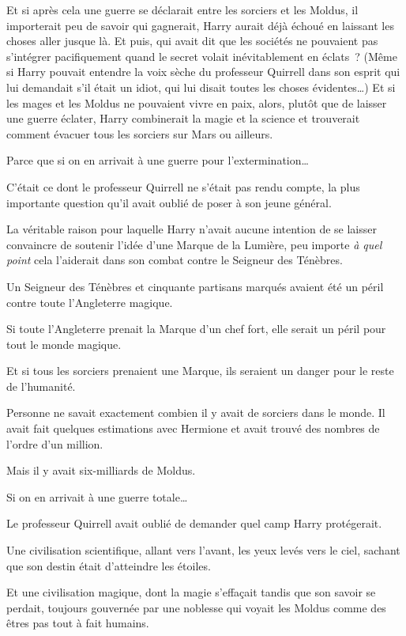 Et si après cela une guerre se déclarait entre les sorciers et les Moldus, il importerait peu de savoir qui gagnerait, Harry aurait déjà échoué en laissant les choses aller jusque là. Et puis, qui avait dit que les sociétés ne pouvaient pas s'intégrer pacifiquement quand le secret volait inévitablement en éclats~? (Même si Harry pouvait entendre la voix sèche du professeur Quirrell dans son esprit qui lui demandait s'il était un idiot, qui lui disait toutes les choses évidentes…) Et si les mages et les Moldus ne pouvaient vivre en paix, alors, plutôt que de laisser une guerre éclater, Harry combinerait la magie et la science et trouverait comment évacuer tous les sorciers sur Mars ou ailleurs.

Parce que si on en arrivait à une guerre pour l'extermination…

C'était ce dont le professeur Quirrell ne s'était pas rendu compte, la plus importante question qu'il avait oublié de poser à son jeune général.

La véritable raison pour laquelle Harry n'avait aucune intention de se laisser convaincre de soutenir l'idée d'une Marque de la Lumière, peu importe \emph{à quel point} cela l'aiderait dans son combat contre le Seigneur des Ténèbres.

Un Seigneur des Ténèbres et cinquante partisans marqués avaient été un péril contre toute l'Angleterre magique.

Si toute l'Angleterre prenait la Marque d'un chef fort, elle serait un péril pour tout le monde magique.

Et si tous les sorciers prenaient une Marque, ils seraient un danger pour le reste de l'humanité.

Personne ne savait exactement combien il y avait de sorciers dans le monde. Il avait fait quelques estimations avec Hermione et avait trouvé des nombres de l'ordre d'un million.

Mais il y avait six-milliards de Moldus.

Si on en arrivait à une guerre totale…

Le professeur Quirrell avait oublié de demander quel camp Harry protégerait.

Une civilisation scientifique, allant vers l'avant, les yeux levés vers le ciel, sachant que son destin était d'atteindre les étoiles.

Et une civilisation magique, dont la magie s'effaçait tandis que son savoir se perdait, toujours gouvernée par une noblesse qui voyait les Moldus comme des êtres pas tout à fait humains.

